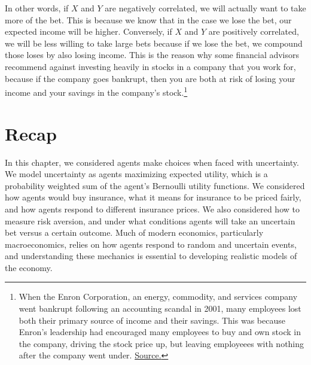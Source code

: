 In other words, if $X$ and $Y$ are negatively correlated, we will actually want to take more of the bet. This is because we know that in the case we lose the bet, our expected income will be higher. Conversely, if $X$ and $Y$ are positively correlated, we will be less willing to take large bets because if we lose the bet, we compound those loses by also losing income. This is the reason why some financial advisors recommend against investing heavily in stocks in a company that you work for, because if the company goes bankrupt, then you are both at risk of losing your income and your savings in the company's stock.\footnote{When the Enron Corporation, an energy, commodity, and services company went bankrupt following an accounting scandal in 2001, many employees lost both their primary source of income and their savings. This was because Enron's leadership had encouraged many employees to buy and own stock in the company, driving the stock price up, but leaving employeees with nothing after the company went under. \href{https://www.marketwatch.com/story/enron-workers-lost-everything-in-collapse-they-say}{Source.}}

\section*{Recap}
In this chapter, we considered agents make choices when faced with uncertainty. We model uncertainty as agents maximizing expected utility, which is a probability weighted sum of the agent's Bernoulli utility functions. We considered how agents would buy insurance, what it means for insurance to be priced fairly, and how agents respond to different insurance prices. We also considered how to measure risk aversion, and under what conditions agents will take an uncertain bet versus a certain outcome. Much of modern economics, particularly macroeconomics, relies on how agents respond to random and uncertain events, and understanding these mechanics is essential to developing realistic models of the economy.